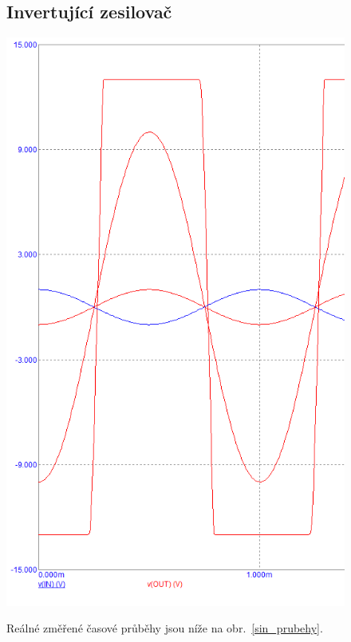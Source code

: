 \documentclass{article}
\newcommand \obr[1]
{ obr.~\ref{#1}}
\begin{document}
\begin{figure}[H]
\begin{minipage}[t]{0.32\textwidth}
    \subsection*{Invertující zesilovač}
    \includegraphics[width=\textwidth]{PC/Tranzientni/in.png}
  \end{minipage}
  \hfill
  \begin{minipage}[t]{0.25\textwidth}
    Reálné změřené časové průběhy jsou níže na \obr{sin_prubehy}. 


\end{minipage}
\end{figure}
\end{document}
